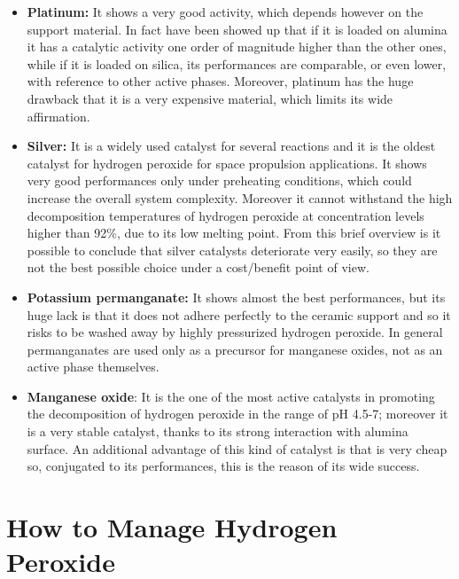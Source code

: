 \documentclass[a4paper]{report}
\begin{document}
\begin{itemize}
\item \textbf{Platinum:} It shows a very good activity, which depends however on the support material. In fact have been showed up that if it is loaded on alumina it has a catalytic activity one order of magnitude higher than the other ones, while if it is loaded on silica, its performances are comparable, or even lower, with reference to other active phases. Moreover, platinum has the huge drawback that it is a very expensive material, which limits its wide affirmation. %
\item \textbf{Silver:} It is a widely used catalyst for several reactions and it is the oldest catalyst for hydrogen peroxide for space propulsion applications. It shows very good performances only under preheating conditions, which could increase the overall system complexity. Moreover it cannot withstand the high decomposition temperatures of hydrogen peroxide at concentration levels higher than 92\%, due to its low melting point. %
From this brief overview is it possible to conclude that silver catalysts deteriorate very easily, so they are not the best possible choice under a cost/benefit point of view. 
\item \textbf{Potassium permanganate:} It shows almost the best performances, but its huge lack is that it does not adhere perfectly to the ceramic support and so it risks to be washed away by highly pressurized hydrogen peroxide. %
In general permanganates are used only as a precursor for manganese oxides, not as an active phase themselves. 
\item \textbf{Manganese oxide}: It is the one of the most active catalysts in promoting the decomposition of hydrogen peroxide in the range of pH 4.5-7; moreover it is a very stable catalyst, thanks to its strong interaction with alumina surface. An additional advantage of this kind of catalyst is that is very cheap so, conjugated to its performances, this is the reason of its wide success.
\end{itemize}

\section{How to Manage Hydrogen Peroxide}
\end{document}
